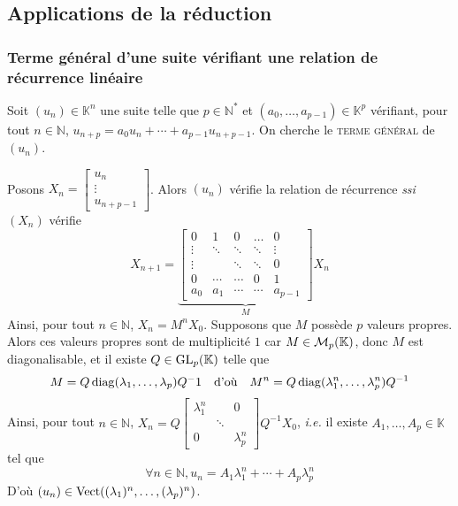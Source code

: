 \subsection{Applications de la réduction}

    \subsubsection{Terme général d’une suite vérifiant une relation de récurrence linéaire}

    Soit $(u_n) \in \mathbb{K}^n$ une suite telle que $p \in \mathbb{N}^*$ et $(a_0, \ldots, a_{p-1}) \in \mathbb{K}^p$ vérifiant, pour tout $n \in \mathbb{N}$, $u_{n+p} = a_0 u_n + \cdots + a_{p-1} u_{n + p-1}$. On cherche le \textsc{terme général} de $(u_n)$. 
    
    Posons $X_n = \begin{bmatrix}
        u_n \\
        \vdots \\
        u_{n + p-1}
    \end{bmatrix}$. Alors $(u_n)$ vérifie la relation de récurrence \textit{ssi} $(X_n)$ vérifie 
    \[ X_{n + 1} = \underbrace{\begin{bmatrix}
        0 & 1 & 0 & \ldots & 0 \\
        \vdots & \ddots & \ddots & \ddots & \vdots \\
        \vdots & & \ddots & \ddots & 0 \\
        0 & \cdots & \cdots & 0 &  1 \\
        a_0 & a_1 & \cdots & \cdots & a_{p-1}
    \end{bmatrix}}_{M} X_n \]  
    Ainsi, pour tout  $n \in \mathbb{N}$, $X_n = M^n X_0$. Supposons que $M$ possède $p$ valeurs propres. Alors ces valeurs propres sont de multiplicité $1$ car $M \in \mathcal{M}_{p}(\mathbb{K})$, donc $M$ est diagonalisable, et il existe $Q \in \operatorname{GL}_p(\mathbb{K})$ telle que 
    \[ M = Q \operatorname{diag}(\lambda_1,\ldots,\lambda_p)Q^-1 \quad \text{d’où} \quad M^n = Q \operatorname{diag}(\lambda_1^n, \ldots, \lambda_p^n) Q^{-1} \] 
    Ainsi, pour tout $n \in \mathbb{N}$, $X_n = Q \begin{bmatrix}
        \lambda_1^n & & 0 \\
        & \ddots & \\
        0 & & \lambda_p^n
    \end{bmatrix} Q^{-1} X_0$, \textit{i.e.} il existe $A_1,\ldots,A_p \in \mathbb{K}$ tel que 
    \[ \forall n \in \mathbb{N}, u_n = A_1 \lambda_1^n + \cdots + A_p \lambda_p^n \]   
    D’où $(u_n) \in \operatorname{Vect}((\lambda_1)^n, \ldots, (\lambda_p)^n)$.

